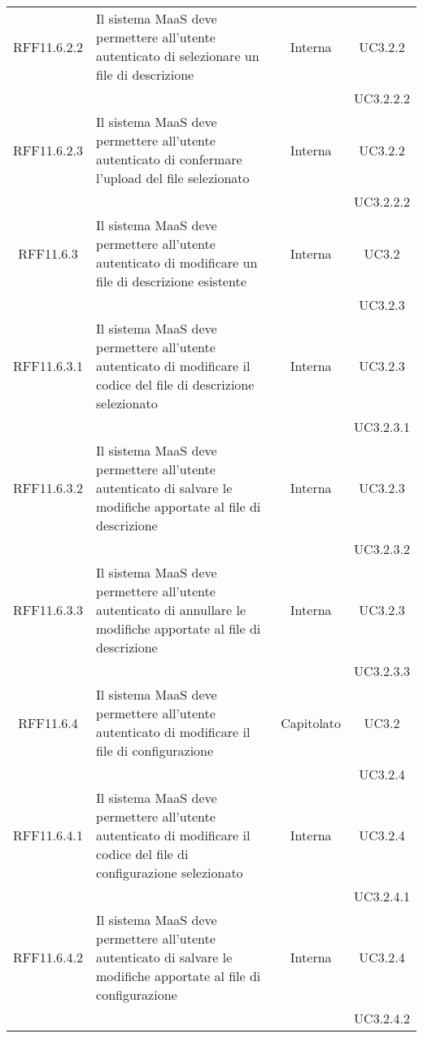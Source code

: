 \begin{longtable}{|c|p{6cm}|c|c|}
\midrule
RFF11.6.2.2
& Il sistema MaaS deve permettere all'utente autenticato di selezionare un file di descrizione
& Interna
& UC3.2.2\\
& & & UC3.2.2.2\\

\midrule
RFF11.6.2.3
& Il sistema MaaS deve permettere all'utente autenticato di confermare l'upload del file selezionato
& Interna
& UC3.2.2\\
& & & UC3.2.2.2\\


\midrule
RFF11.6.3
& Il sistema MaaS deve permettere all'utente autenticato di modificare un file di descrizione esistente
& Interna
& UC3.2\\
& & & UC3.2.3\\

\midrule
RFF11.6.3.1
& Il sistema MaaS deve permettere all'utente autenticato di modificare il codice del file di descrizione selezionato
& Interna
& UC3.2.3\\
& & & UC3.2.3.1\\

\midrule
RFF11.6.3.2
& Il sistema MaaS deve permettere all'utente autenticato di salvare le modifiche apportate al file di descrizione
& Interna
& UC3.2.3\\
& & & UC3.2.3.2\\

\midrule
RFF11.6.3.3
& Il sistema MaaS deve permettere all'utente autenticato di annullare le modifiche apportate al file di descrizione
& Interna
& UC3.2.3\\
& & & UC3.2.3.3\\

\midrule
RFF11.6.4
& Il sistema MaaS deve permettere all'utente autenticato di modificare il file di configurazione
& Capitolato
& UC3.2\\
& & & UC3.2.4\\

\midrule
RFF11.6.4.1
& Il sistema MaaS deve permettere all'utente autenticato di modificare il codice del file di configurazione selezionato
& Interna
& UC3.2.4\\
& & & UC3.2.4.1\\

\midrule
RFF11.6.4.2
& Il sistema MaaS deve permettere all'utente autenticato di salvare le modifiche apportate al file di configurazione
& Interna
& UC3.2.4\\
& & & UC3.2.4.2\\


\end{longtable}
